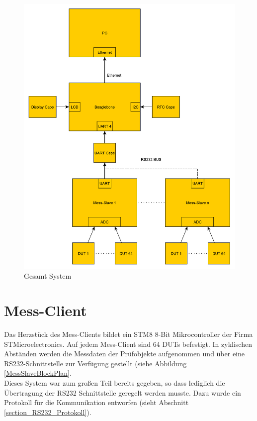 \begin{figure}[H]
\begin{center}
\includegraphics[width=\textwidth]{img/general/BlockPlan.pdf}
\caption{Gesamt System}
\label{Gesamt_System}
\end{center}
\end{figure}


\section{Mess-Client}
\label{section_Mess-Client}

Das Herzstück des Mess-Clients bildet ein STM8  8-Bit Mikrocontroller der Firma STMicroelectronics.
Auf jedem Mess-Client sind 64 \acp{DUT} befestigt. In zyklischen Abständen werden die Messdaten der Prüfobjekte aufgenommen und über eine RS232-Schnittstelle zur Verfügung gestellt (siehe Abbildung \ref{MessSlaveBlockPlan}.\\
Dieses System war zum großen Teil bereits gegeben, so dass lediglich die Übertragung der RS232 Schnittstelle geregelt werden musste. Dazu wurde ein Protokoll für die Kommunikation entworfen (sieht Abschnitt \ref{section_RS232_Protokoll}).
 
